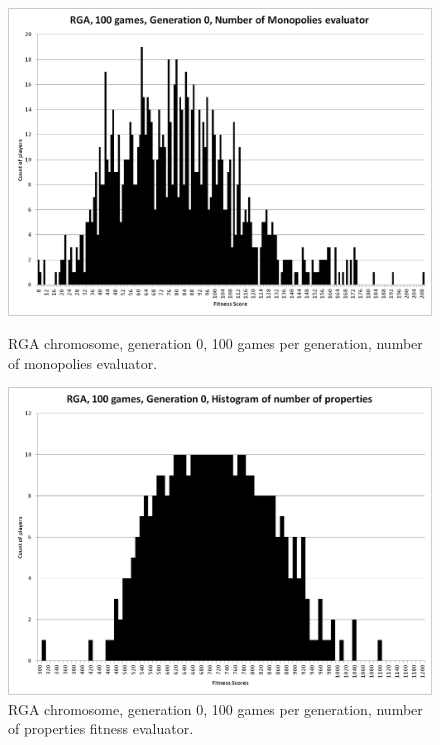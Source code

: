 \begin{figure}
\begin{minipage}[t]{0.47\linewidth}
\centering
\includegraphics[width=1.0\linewidth]{Figures/RGA_1024_G000_N100_NM.png}
\caption[RGA Num Monopolies Fitness Distribution, Initial Generation]{RGA
chromosome, generation 0, 100 games per generation, number of monopolies evaluator.}
\label{figure-RGA-G000-N100-NM-initial_fitness}
\end{minipage}%
\hspace{0.06\linewidth}%
\begin{minipage}[t]{0.47\linewidth}
\centering
\includegraphics[width=1.0\linewidth]{Figures/RGA_1024_G000_N100_NP.png}
\caption[RGA Num Properties Fitness Distribution, Initial Generation]{RGA
chromosome, generation 0, 100 games per generation, number of properties fitness evaluator.}
\label{figure-RGA-G000-N100-NP-initial_fitness}

\end{minipage}
\end{figure}

